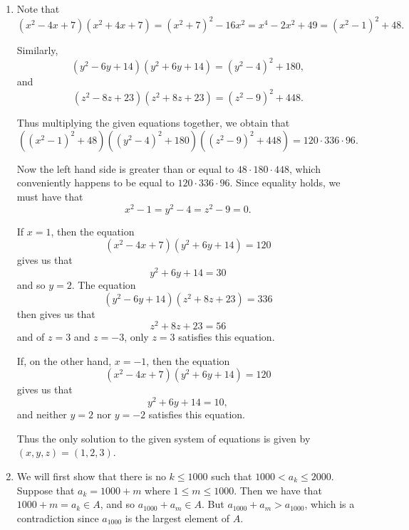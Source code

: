 \documentclass[12pt]{article}
\begin{document}
\begin{enumerate}
\item %
Note that
\[
    (x^2 - 4x + 7)(x^2 + 4x + 7) = (x^2 + 7)^2 - 16x^2 = x^4 - 2x^2 + 49 = (x^2
    - 1)^2 + 48.
\]

Similarly,
\[
    (y^2 - 6y + 14)(y^2 + 6y + 14) = (y^2 - 4)^2 + 180,
\]
and
\[
    (z^2 - 8z + 23)(z^2 + 8z + 23) = (z^2 - 9)^2 + 448.
\]

Thus multiplying the given equations together, we obtain that
\[
    \left( (x^2 - 1)^2 + 48 \right) \left( (y^2 - 4)^2 + 180 \right) \left( (z^2
    - 9)^2 + 448 \right) = 120 \cdot 336 \cdot 96.
\]

Now the left hand side is greater than or equal to $48 \cdot 180 \cdot 448$,
which conveniently happens to be equal to $120 \cdot 336 \cdot 96$. Since
equality holds, we must have that
\[
    x^2 - 1 = y^2 - 4 = z^2 - 9 = 0.
\]

If $x = 1$, then the equation
\[
    (x^2 - 4x + 7)(y^2 + 6y + 14) = 120
\]
gives us that
\[
    y^2 + 6y + 14 = 30
\]
and so $y = 2$. The equation
\[
    (y^2 - 6y + 14)(z^2 + 8z + 23) = 336
\]
then gives us that
\[
    z^2 + 8z + 23 = 56
\]
and of $z = 3$ and $z = -3$, only $z = 3$ satisfies this equation.

If, on the other hand, $x = -1$, then the equation
\[
    (x^2 - 4x + 7)(y^2 + 6y + 14) = 120
\]
gives us that
\[
    y^2 + 6y + 14 = 10,
\]
and neither $y = 2$ nor $y = -2$ satisfies this equation.

Thus the only solution to the given system of equations is given by $(x, y, z) =
(1, 2, 3)$.



\item %
We will first show that there is no $k \leq 1000$ such that $1000 < a_k \leq
2000$. Suppose that $a_k = 1000 + m$ where $1 \leq m \leq 1000$. Then we have
that $1000 + m = a_k \in A$, and so $a_{1000} + a_m \in A$. But $a_{1000} + a_m
> a_{1000}$, which is a contradiction since $a_{1000}$ is the largest element of
$A$.


\end{enumerate}
\end{document}
